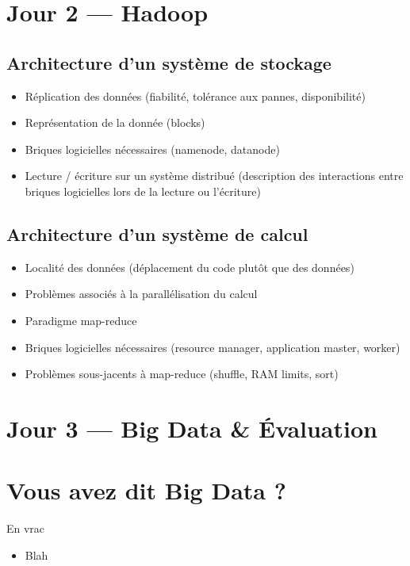 \documentclass[utf8,12pt,draft]{article}
\begin{document}
\section{Jour 2 --- {\sc Hadoop}}

\subsection{Architecture d'un syst\`eme de stockage}
\begin{itemize}
\item R\'eplication des donn\'ees (fiabilit\'e, tol\'erance aux pannes, disponibilit\'e)
\item Repr\'esentation de la donn\'ee (blocks)
\item Briques logicielles n\'ecessaires (namenode, datanode)
\item Lecture / \'ecriture sur un syst\`eme distribu\'e (description des
      interactions entre briques logicielles lors de la lecture ou l'\'ecriture)
\end{itemize}


\subsection{Architecture d'un syst\`eme de calcul}
\begin{itemize}
\item Localit\'e des donn\'ees (d\'eplacement du code plutôt que des données)
\item Probl\`emes associ\'es \`a la parall\'elisation du calcul
\item Paradigme map-reduce
\item Briques logicielles n\'ecessaires (resource manager, application master, worker)
\item Probl\`emes sous-jacents \`a map-reduce (shuffle, RAM limits, sort)
\end{itemize}


\section{Jour 3 --- Big Data \& \'Evaluation}

\section{Vous avez dit {\sc Big Data} \cite{wikibigdata} ?}
En vrac
\begin{itemize}
\item Blah
\end{itemize}



\end{document}
